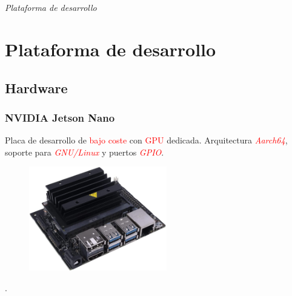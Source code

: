\documentclass{beamer}
\begin{document}

\section*{}
\begin{frame}{}
	\centering \Huge
	\emph{Plataforma de desarrollo}
\end{frame}

\section{Plataforma de desarrollo}
\subsection{Hardware}
\begin{frame}
	\frametitle{NVIDIA Jetson Nano}
	\begin{outline}
		\1 Placa de desarrollo de \textcolor{red}{bajo coste} con \textcolor{red}{GPU} dedicada.
		\1 Arquitectura \textcolor{red}{\textit{Aarch64}}, soporte para \textcolor{red}{\textit{GNU/Linux}} y puertos \textcolor{red}{\textit{GPIO}}.
	\end{outline}
	\begin{figure}
		\centering
		\includegraphics[width=6cm]{figs/jetsonnano}
	\end{figure}
	.
\end{frame}
\end{document}
